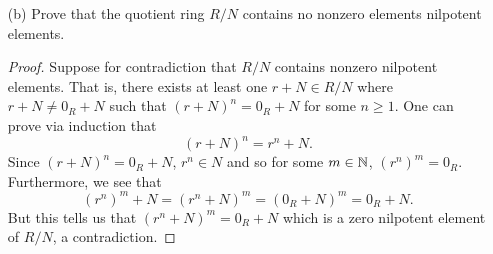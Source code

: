 \documentclass[a4paper]{article}
\begin{document}
\begin{problem}
\begin{enumerate}
\begin{proof}
           (ii) Similarly, let \( y \in Nr \). Then \( y = zr \) for some \( z \in N  \). Since \( z \in N  \), there exists an \( m \in \N  \) such that \( z^{m} = 0  \). Then 
           \[  y^{m} = (zr)^{m} = z^{m} r^{m} = {0}_{R} \cdot r^{m}  = {0}_{R}.\]
           Thus, it follows that \( y \in N  \). Since \( N \) is closed under left and right multiplication, it follows that \( N \) must be an ideal of \( R  \).
           \end{proof}
        \item[(b)] Prove that the quotient ring \( R / N  \) contains no nonzero elements nilpotent elements.
            \begin{proof}
            Suppose for contradiction that \( R / N  \) contains nonzero nilpotent elements. That is, there exists at least one \( r + N \in R / N  \) where \( r + N \neq {0}_{R}  + N  \) such that \( (r + N)^{n} = {0}_{R} + N  \) for some \( n \geq 1  \). One can prove via induction that   
            \[  (r + N)^{n} = r^{n} + N.  \]
            Since \( (r+N)^{n} = {0}_{R} + N  \), \( r^{n} \in N  \) and so for some \( m \in \N  \), \( (r^{n})^{m} = {0}_{R} \). Furthermore, we see that 
            \[  (r^{n})^{m} + N = (r^{n} + N )^{m} = ({0}_{R} + N)^{m} = {0}_{R} + N. \]
            But this tells us that \( (r^{n} + N)^{m} = {0}_{R} + N  \) which is a zero nilpotent element of \( R / N  \), a contradiction.
            \end{proof}
   \end{enumerate}
\end{problem}
\end{document}
